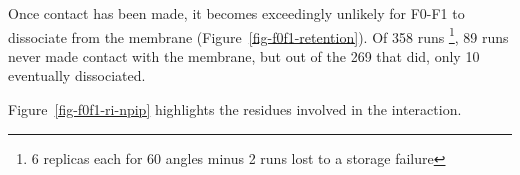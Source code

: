 \documentclass[
  twocolumn]{biophys-new-mod}
\begin{document}
Once contact has been made, it becomes exceedingly unlikely for F0-F1 to
dissociate from the membrane (Figure~\ref{fig-f0f1-retention}). Of 358
runs \footnote{6 replicas each for 60 angles minus 2 runs lost to a
  storage failure}, 89 runs never made contact with the membrane, but
out of the 269 that did, only 10 eventually dissociated.

Figure~\ref{fig-f0f1-ri-npip} highlights the residues involved in the
interaction.

\begin{figure}

\begin{minipage}[t]{0.33\linewidth}

{\centering 


}

\subcaption{\label{fig-f0f1-unbound}~}
\end{minipage}%
%
\begin{minipage}[t]{0.33\linewidth}

{\centering 

}
\end{minipage}
\end{figure}
\end{document}
